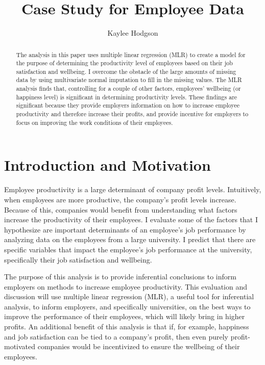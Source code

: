 \documentclass{svproc}
\begin{document}
\mainmatter              
\title{Case Study for Employee Data}
%
\author{Kaylee Hodgson}
%

\maketitle

\begin{abstract}
The analysis in this paper uses multiple linear regression (MLR) to create a model for the purpose of determining the productivity level of employees based on their job satisfaction and wellbeing. I overcome the obstacle of the large amounts of missing data by using multivariate normal imputation to fill in the missing values. The MLR analysis finds that, controlling for a couple of other factors, employees' wellbeing (or happiness level) is significant in determining productivity levels. These findings are significant because they provide employers information on how to increase employee productivity and therefore increase their profits, and provide incentive for employers to focus on improving the work conditions of their employees.
\end{abstract}

\section{Introduction and Motivation}

Employee productivity is a large determinant of company profit levels. Intuitively, when employees are more productive, the company's profit levels increase. Because of this, companies would benefit from understanding what factors increase the productivity of their employees. I evaluate some of the factors that I hypothesize are important determinants of an employee's job performance by analyzing data on the employees from a large university. I predict that there are specific variables that impact the employee's job performance at the university, specifically their job satisfaction and wellbeing. 

The purpose of this analysis is to provide inferential conclusions to inform employers on methods to increase employee productivity. This evaluation and discussion will use multiple linear regression (MLR), a useful tool for inferential analysis, to inform employers, and specifically universities, on the best ways to improve the performance of their employees, which will likely bring in higher profits. An additional benefit of this analysis is that if, for example, happiness and job satisfaction can be tied to a company's profit, then even purely profit-motivated companies would be incentivized to ensure the wellbeing of their employees.
\end{document}
